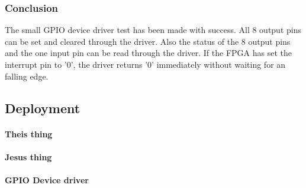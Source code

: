 %
\subsubsection{Conclusion}
The small GPIO device driver test has been made with success. All 8 output pins can be set and cleared through the driver. Also the status of the 8 output pins and the one input pin can be read through the driver. If the FPGA has set the interrupt pin to '0', the driver returns '0' immediately without waiting for an falling edge.
\subsection{Deployment}
\paragraph{Theis thing}
%
%
\paragraph{Jesus thing}
%
%
\paragraph{GPIO Device driver}
%
%